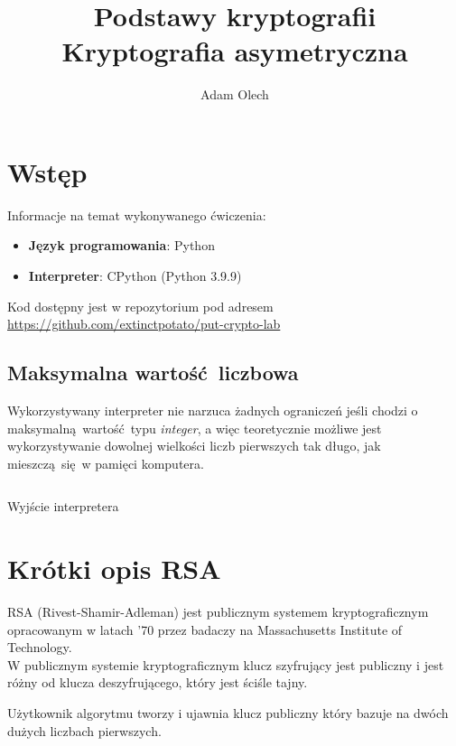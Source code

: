 \documentclass[12pt]{article}
\title{Podstawy kryptografii \\ \large Kryptografia asymetryczna}
\author{Adam Olech}
\begin{document}
\maketitle

\tableofcontents
\newpage

\section{Wstęp}

Informacje na temat wykonywanego ćwiczenia:

\begin{itemize}
	\item \textbf{Język programowania}: Python
	\item \textbf{Interpreter}: CPython (Python 3.9.9)
\end{itemize}

Kod dostępny jest w repozytorium pod adresem \url{https://github.com/extinctpotato/put-crypto-lab}

\subsection{Maksymalna wartość liczbowa}

Wykorzystywany interpreter nie narzuca żadnych ograniczeń jeśli chodzi
o maksymalną wartość typu \textit{integer}, a więc teoretycznie
możliwe jest wykorzystywanie dowolnej wielkości liczb pierwszych tak długo,
jak mieszczą się w pamięci komputera.

\begin{listing}[H]
	\inputminted[breakafter=_,breaklines,tabsize=2]{python}{3-python-bigint.txt }
	\caption{Wyjście interpretera}
\end{listing}

\section{Krótki opis RSA}

RSA (Rivest-Shamir-Adleman) jest publicznym systemem kryptograficznym
opracowanym w latach '70 przez badaczy na Massachusetts Institute of Technology.
\\

W publicznym systemie kryptograficznym klucz szyfrujący jest publiczny
i jest różny od klucza deszyfrującego, który jest ściśle tajny.

Użytkownik algorytmu tworzy i ujawnia klucz publiczny który bazuje na dwóch
dużych liczbach pierwszych.
\\
\end{document}
